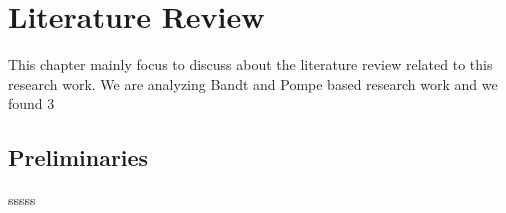 \chapter{Literature Review}\label{C:lit}

This chapter mainly focus to discuss about the literature review related to this research work. We are analyzing Bandt and Pompe based research work and we found 3

\section{Preliminaries}
sssss

